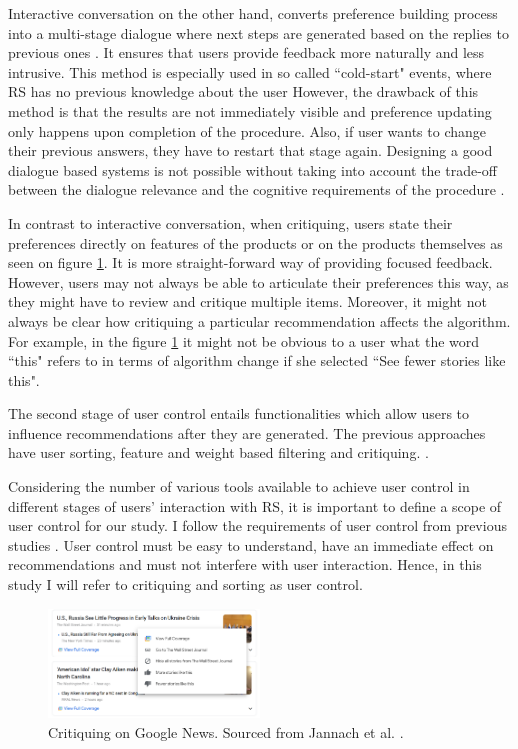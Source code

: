 \documentclass[a4paper,12pt]{article}
\newcommand{\citeyearonly}[1]{\citeyearpar{#1}}
\begin{document}
Interactive conversation on the other hand, converts preference building process into a multi-stage dialogue where next steps are generated based on the replies to previous ones \citep{he2016interactive}. It ensures that users provide feedback more naturally and less intrusive. This method is especially used in so called ``cold-start" events, where RS has no previous knowledge about the user \citep{guAddressingColdStartProblem2019} However, the drawback of this method is that the results are not immediately visible and preference updating only happens upon completion of the procedure. Also, if user wants to change their previous answers, they have to restart that stage again. Designing a good dialogue based systems is not possible without taking into account the trade-off between the dialogue relevance and the cognitive requirements of the procedure \citep{Gao_2021}. 

In contrast to interactive conversation, when critiquing, users state their preferences directly on features of the products or on the products themselves as seen on figure \ref{fig:critiquing}. It is more straight-forward way of providing focused feedback. However, users may not always be able to articulate their preferences this way, as they might have to review and critique multiple items. Moreover, it might not always be clear how critiquing a particular recommendation affects the algorithm. For example, in the figure \ref{fig:critiquing} it might not be obvious to a user what the word ``this" refers to in terms of algorithm change if she selected ``See fewer stories like this".

The second stage of user control entails functionalities which allow users to influence recommendations after they are generated. The previous approaches have user sorting, feature and weight based filtering and critiquing. \citep{jannach2017user, bostandjiev2012tasteweights, swearingen2001beyond, schafer2002meta, schaffer2015hypothetical}. 

Considering the number of various tools available to achieve user control in different stages of users' interaction with RS, it is important to define a scope of user control for our study. I follow the requirements of user control from previous  studies \citep{jannach2017user}. User control must be easy to understand, have an immediate effect on recommendations and must not interfere with user interaction. Hence, in this study I will refer to critiquing and sorting as user control. 

\begin{figure}[H]
    \centering
    \includegraphics[width=0.5\textwidth]{staticFiles/critiquingRS.PNG}
    \caption{Critiquing on Google News. Sourced from Jannach et al. \citeyearonly{jannach2017user}.}
    \label{fig:critiquing}
\end{figure}
\end{document}
